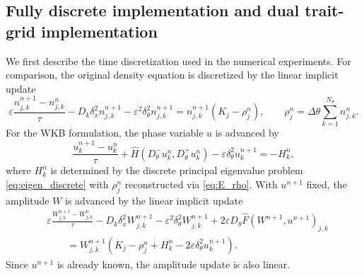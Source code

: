 \documentclass[11pt]{article}
\begin{document}
\subsection{Fully discrete implementation and dual trait-grid implementation}
\label{subsec:dual_grid}

We first describe the time discretization used in the numerical experiments.
For comparison, the original density equation is discretized by the linear
implicit update
\begin{equation}\label{eq:direct_density_fully}
    \varepsilon
    \frac{n_{j,k}^{n+1}-n_{j,k}^n}{\tau}
    -
    D_k\delta_x^2n_{j,k}^{n+1}
    -
    \varepsilon^2\delta_\theta^2n_{j,k}^{n+1}
    =
    n_{j,k}^{n+1}(K_j-\rho_j^n),
    \qquad
    \rho_j^n=\Delta\theta\sum_{k=1}^{N_\theta} n_{j,k}^n .
\end{equation}
For the WKB formulation, the phase variable $u$ is advanced by
\begin{equation}\label{eq:wkb_fully_u}
    \frac{u_k^{n+1}-u_k^n}{\tau}
    +
    \widehat H(D_\theta^-u_k^n,D_\theta^+u_k^n)
    -
    \varepsilon\delta_\theta^2u_k^{n+1}
    =
    -H_k^n, 
\end{equation}
where $H_k^n$ is determined by the discrete
principal eigenvalue problem \eqref{eq:eigen_discrete} 
with $ \rho_j^n$ reconstructed via \eqref{eq:E_rho}. 
With \(u^{n+1}\) fixed, the amplitude $W$ is advanced by the linear implicit
update
\begin{equation}\label{eq:wkb_fully_W}
\begin{aligned}
    &\varepsilon
    \frac{W_{j,k}^{n+1}-W_{j,k}^n}{\tau}
    -
    D_k\delta_x^2W_{j,k}^{n+1}
    -
    \varepsilon^2\delta_\theta^2W_{j,k}^{n+1}
    +
    2\varepsilon D_\theta\widehat F(W^{n+1},u^{n+1})_{j,k}
    \\
    &\qquad
    =
    W_{j,k}^{n+1}
    \left(
        K_j-\rho_j^n+H_k^n
        -2\varepsilon\delta_\theta^2u_k^{n+1}
    \right).
\end{aligned}
\end{equation}
Since \(u^{n+1}\) is already known, the amplitude update is also linear.  
\end{document}
